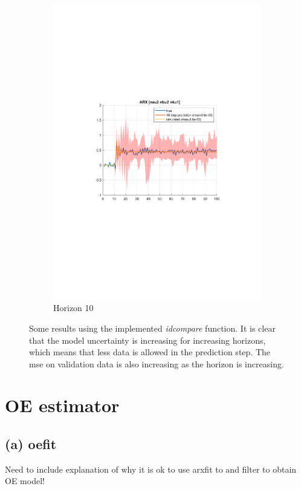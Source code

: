 \documentclass[]{article}
\begin{document}
\begin{figure}[ht]
\begin{subfigure}{.30\textwidth}
	\includegraphics[trim= 10cm 8cm 10cm 8cm, scale=0.3]{figures/1d-horizon_10.pdf}
	\caption{Horizon 10}
	\label{fig:1d-horizon10}
\end{subfigure}
\caption{Some results using the implemented \emph{idcompare} function. It is clear that the model uncertainty is increasing for increasing horizons, which means that less data is allowed in the prediction step. The mse on validation data is also increasing as the horizon is increasing.}
\label{fig:1d}
\end{figure}

\section{OE estimator}

\subsection{(a) oefit}
Need to include explanation of why it is ok to use arxfit to and filter to obtain OE model!
\end{document}

